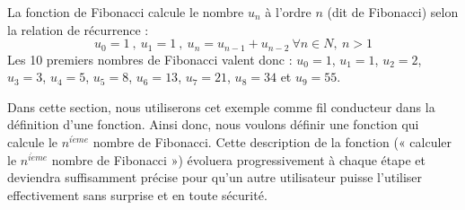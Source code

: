 \begin{ex}\label{ex:fibonacci}
La fonction de Fibonacci calcule le nombre $u_n$ à l'ordre $n$ (dit de Fibonacci) 
selon la relation de récurrence :
$$u_0 = 1\ ,\ u_1 = 1\ ,\ u_n = u_{n-1} + u_{n-2}\ \forall n \in N,\ n > 1$$
Les 10 premiers nombres de Fibonacci valent donc : $u_0 = 1$, $u_1 = 1$, $u_2 = 2$,
$u_3 = 3$, $u_4 = 5$, $u_5 = 8$, $u_6 = 13$, $u_7 = 21$, $u_8 = 34$ et $u_9 = 55$.
\end{ex}
\noindent Dans cette section, nous utiliserons cet exemple comme fil conducteur
dans la définition d'une fonction. Ainsi donc, nous voulons définir une fonction
qui calcule le $n^{i\grave eme}$ nombre de Fibonacci. Cette description de la fonction
(« calculer le $n^{i\grave eme}$ nombre de Fibonacci ») évoluera progressivement
à chaque étape et deviendra suffisamment précise pour qu'un autre utilisateur puisse
l'utiliser effectivement sans surprise et en toute sécurité.


